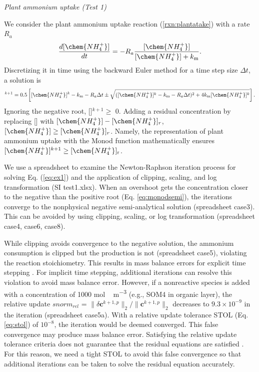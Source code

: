 \documentclass[gmd, manuscript]{copernicus}
\begin{document}
\noindent \emph{Plant ammonium uptake (Test 1)}

We consider the plant ammonium uptake reaction (\ref{rxn:plantatake}) with a
rate $R_a$
\begin{equation}
\frac{d[\chem{NH_4^+}]}{dt} =- R_a \frac{[\chem{NH_4^+}]}{[\chem{NH_4^+}]+k_\text{m}}.
\label{eq:ex1}
\end{equation}
Discretizing it in
time using the backward Euler method for a time step size $\Delta t$, a solution is
\begin{equation}
[\chem{NH_4^+}]^{k+1}=0.5 \left[[\chem{NH_4^+}]^k - k_\text{m} - R_a \Delta t
\pm \sqrt{([\chem{NH_4^+}]^k - k_\text{m} - R_a\Delta t)^2 + 4
k_\text{m}[\chem{NH_4^+}]^k}\right].
\label{eq:monodsemi}
\end{equation}
Ignoring the negative root, []$^{k+1}\geq$
0. Adding a residual concentration by replacing [] with
$[\chem{NH_4^+}]-[\chem{NH_4^+}]_r$, $[\chem{NH_4^+}]\geq[\chem{NH_4^+}]_r$.
Namely, the representation of plant ammonium uptake with the Monod function
mathematically ensures $[\chem{NH_4^+}]^{k+1} \geq [\chem{NH_4^+}]_\text{r}$. 

We use a spreadsheet to examine the Newton-Raphson iteration process for solving
Eq. (\ref{eq:ex1}) and the application of clipping, scaling, and log
transformation (SI test1.xlsx). When an overshoot gets the concentration closer
to the negative than the positive root (Eq. \ref{eq:monodsemi}), the iterations
converge to the nonphysical negative semi-analytical solution (spreadsheet case3).
This can be avoided by using clipping, scaling, or log transformation (spreadsheet
case4, case6, case8). 

While clipping avoids convergence to the negative solution, the ammonium
consumption is clipped but the  production is not (spreadsheet case5),
violating the reaction stoichiometry. This results in mass balance errors for
explicit time stepping \citep{Tang2015}. For  implicit time stepping,
additional iterations can resolve this violation to avoid mass balance error.
However, if a nonreactive species is added with a concentration of 1000
\unit{mol\,m^{-3}} (e.g., SOM4 in organic layer), the relative update $snorm_{rel}$ =
${\|\delta \mathbf{c}^{k+1,p}\|_2}/{\|\mathbf{c}^{k+1,p} \|_2}$ decreases to
$9.3\times 10^{-9}$ in the iteration (spreadsheet case5a). 
With a relative update
tolerance STOL (Eq. \ref{eq:stol}) of $10^{-8}$, the iteration would be deemed
converged. This false convergence may produce mass balance error. Satisfying
the relative update tolerance criteria does not guarantee that the residual
equations are satisfied \citep{Lichtner2015}. For this reason, we need a tight
STOL to avoid this false convergence so that additional iterations can be taken
to solve the residual equation accurately. 
 
\end{document}
